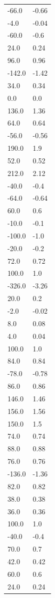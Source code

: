 \begin{longtable}{ll}
-66.0 & -0.66 \\
-4.0 & -0.04 \\
-60.0 & -0.6 \\
24.0 & 0.24 \\
96.0 & 0.96 \\
-142.0 & -1.42 \\
34.0 & 0.34 \\
0.0 & 0.0 \\
136.0 & 1.36 \\
64.0 & 0.64 \\
-56.0 & -0.56 \\
190.0 & 1.9 \\
52.0 & 0.52 \\
212.0 & 2.12 \\
-40.0 & -0.4 \\
-64.0 & -0.64 \\
60.0 & 0.6 \\
-10.0 & -0.1 \\
-100.0 & -1.0 \\
-20.0 & -0.2 \\
72.0 & 0.72 \\
100.0 & 1.0 \\
-326.0 & -3.26 \\
20.0 & 0.2 \\
-2.0 & -0.02 \\
8.0 & 0.08 \\
4.0 & 0.04 \\
100.0 & 1.0 \\
84.0 & 0.84 \\
-78.0 & -0.78 \\
86.0 & 0.86 \\
146.0 & 1.46 \\
156.0 & 1.56 \\
150.0 & 1.5 \\
74.0 & 0.74 \\
88.0 & 0.88 \\
76.0 & 0.76 \\
-136.0 & -1.36 \\
82.0 & 0.82 \\
38.0 & 0.38 \\
36.0 & 0.36 \\
100.0 & 1.0 \\
-40.0 & -0.4 \\
70.0 & 0.7 \\
42.0 & 0.42 \\
60.0 & 0.6 \\
24.0 & 0.24 \\

\end{longtable}
